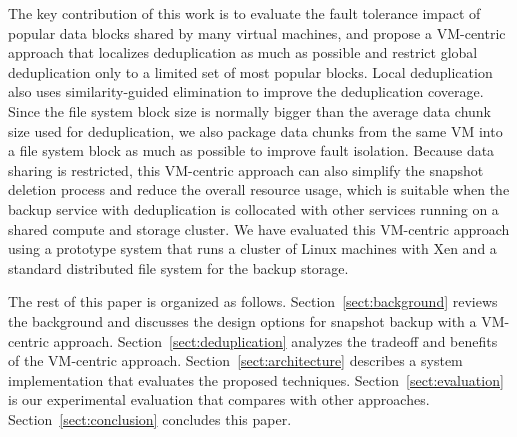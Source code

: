 The key contribution of this work is to evaluate the fault tolerance  impact of popular data blocks shared by many
virtual machines, and   propose a VM-centric approach that localizes deduplication as much as possible 
and restrict global deduplication only to a limited set of most popular blocks.
Local deduplication also uses similarity-guided elimination to improve the deduplication coverage.
Since the file system block size is normally bigger than the average data chunk size used for deduplication,
we also package data chunks from the same VM into a file system block as much as possible to improve fault isolation.
Because data sharing is restricted, 
this VM-centric approach can also simplify the snapshot deletion process and reduce the overall resource usage, which
is suitable when the backup service with deduplication is collocated with other services running on a shared compute and storage
cluster.
We have evaluated this VM-centric approach using  a prototype system that runs a cluster of Linux machines with Xen and 
a standard distributed file system for the backup storage. 




The rest of this paper is organized as follows.
Section~\ref{sect:background} reviews the background and discusses the  design options for snapshot backup 
with a VM-centric approach. 
Section~\ref{sect:deduplication}  analyzes the tradeoff and benefits of the VM-centric approach. 
Section~\ref{sect:architecture}  describes a system implementation that evaluates the proposed techniques.
Section~\ref{sect:evaluation} is our experimental evaluation that compares with other approaches.
Section~\ref{sect:conclusion}  concludes this paper.
